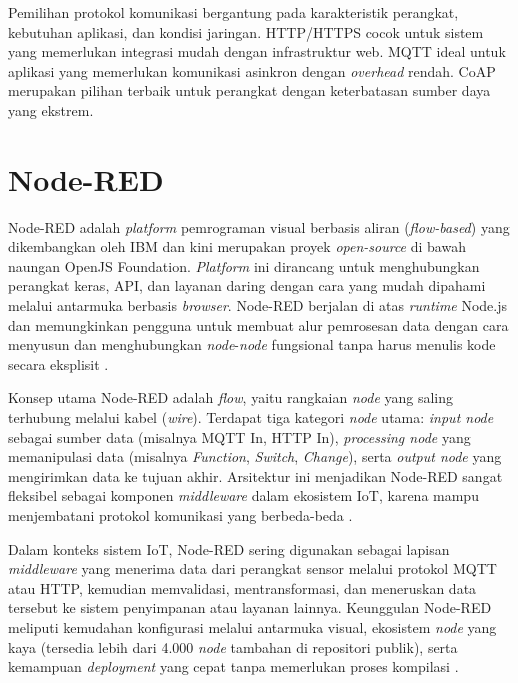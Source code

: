 Pemilihan protokol komunikasi bergantung pada karakteristik perangkat, kebutuhan aplikasi, dan kondisi jaringan. HTTP/HTTPS cocok untuk sistem yang memerlukan integrasi mudah dengan infrastruktur web. MQTT ideal untuk aplikasi yang memerlukan komunikasi asinkron dengan \textit{overhead} rendah. CoAP merupakan pilihan terbaik untuk perangkat dengan keterbatasan sumber daya yang ekstrem.

\section{Node-RED}

Node-RED adalah \textit{platform} pemrograman visual berbasis aliran (\textit{flow-based}) yang dikembangkan oleh IBM dan kini merupakan proyek \textit{open-source} di bawah naungan OpenJS Foundation. \textit{Platform} ini dirancang untuk menghubungkan perangkat keras, API, dan layanan daring dengan cara yang mudah dipahami melalui antarmuka berbasis \textit{browser}. Node-RED berjalan di atas \textit{runtime} Node.js dan memungkinkan pengguna untuk membuat alur pemrosesan data dengan cara menyusun dan menghubungkan \textit{node}-\textit{node} fungsional tanpa harus menulis kode secara eksplisit \autocite{openjs2024}.

Konsep utama Node-RED adalah \textit{flow}, yaitu rangkaian \textit{node} yang saling terhubung melalui kabel (\textit{wire}). Terdapat tiga kategori \textit{node} utama: \textit{input node} sebagai sumber data (misalnya MQTT In, HTTP In), \textit{processing node} yang memanipulasi data (misalnya \textit{Function}, \textit{Switch}, \textit{Change}), serta \textit{output node} yang mengirimkan data ke tujuan akhir. Arsitektur ini menjadikan Node-RED sangat fleksibel sebagai komponen \textit{middleware} dalam ekosistem IoT, karena mampu menjembatani protokol komunikasi yang berbeda-beda \autocite{blackstock2016}.

Dalam konteks sistem IoT, Node-RED sering digunakan sebagai lapisan \textit{middleware} yang menerima data dari perangkat sensor melalui protokol MQTT atau HTTP, kemudian memvalidasi, mentransformasi, dan meneruskan data tersebut ke sistem penyimpanan atau layanan lainnya. Keunggulan Node-RED meliputi kemudahan konfigurasi melalui antarmuka visual, ekosistem \textit{node} yang kaya (tersedia lebih dari 4.000 \textit{node} tambahan di repositori publik), serta kemampuan \textit{deployment} yang cepat tanpa memerlukan proses kompilasi \autocite{clerissi2018}.

